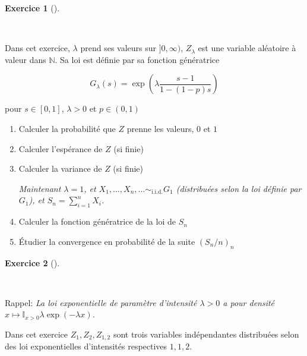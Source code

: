 \documentclass[
  french,
  11pt,
  a4paper,
  twoside,
  article,
  titlepage=false]{memoir}
\theoremstyle{definition}
\newtheorem{exercise}{Exercice}[section]
\theoremstyle{remark}
\begin{document}
\begin{exercise}[]\protect\hypertarget{exr-3-a}{}\label{exr-3-a}

~

\end{exercise}

Dans cet exercice, \(\lambda\) prend ses valeurs sur \(]0, \infty)\),
\(Z_{\lambda}\) est une variable aléatoire à valeur dans \(\mathbb{N}\).
Sa loi est définie par sa fonction génératrice

\[G_\lambda(s) = \exp\left(\lambda \frac{s -1 }{1 - (1-p)s} \right)\]

pour \(s \in [0,1]\), \(\lambda>0\) et \(p\in (0,1)\)

\begin{enumerate}
\def\labelenumi{\arabic{enumi}.}
\item
  Calculer la probabilité que \(Z\) prenne les valeurs, \(0\) et \(1\)
\item
  Calculer l'espérance de \(Z\) (si finie)
\item
  Calculer la variance de \(Z\) (si finie)

  \emph{Maintenant \(\lambda=1\), et
  \(X_1, \ldots, X_n, \ldots \sim_{\text{i.i.d.}} G_1\) (distribuées
  selon la loi définie par \(G_1\)), et \(S_n = \sum_{i=1}^n X_i\).}
\item
  Calculer la fonction génératrice de la loi de \(S_n\)
\item
  Étudier la convergence en probabilité de la suite \((S_n/n)_n\)
\end{enumerate}

\newpage{}

\begin{exercise}[]\protect\hypertarget{exr-5-a}{}\label{exr-5-a}

~

\end{exercise}

\begin{tcolorbox}[enhanced jigsaw, arc=.35mm, bottomrule=.15mm, breakable, colback=white, colframe=quarto-callout-note-color-frame, left=2mm, leftrule=.75mm, opacityback=0, rightrule=.15mm, toprule=.15mm]

Rappel: \emph{La loi exponentielle de paramètre d'intensité
\(\lambda>0\) a pour densité
\(x \mapsto \mathbb{I}_{x>0} \lambda \exp(-\lambda x)\).}

\end{tcolorbox}

Dans cet exercice \(Z_1, Z_2, Z_{1,2}\) sont trois variables
indépendantes distribuées selon des loi exponentielles d'intensités
respectives \(1, 1, 2\).
\end{document}
